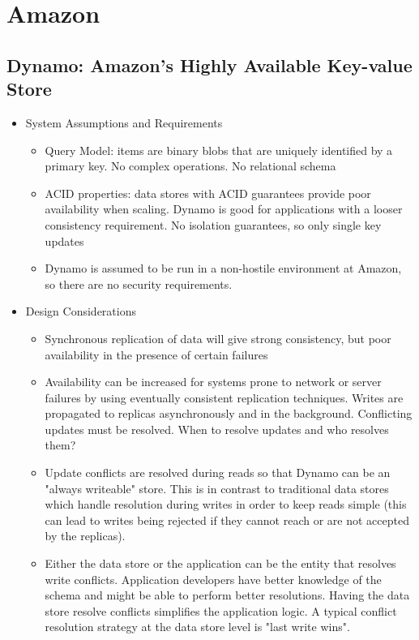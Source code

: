\documentclass[a4paper]{article}
\begin{document}
\section{Amazon}

\subsection{Dynamo: Amazon's Highly Available Key-value Store}

\begin{itemize}
\item System Assumptions and Requirements
\begin{itemize}
\item Query Model: items are binary blobs that are uniquely identified by a primary key. No complex operations. No relational schema

\item  ACID properties: data stores with ACID guarantees provide poor availability when scaling. Dynamo is good for applications with a looser consistency requirement. No isolation guarantees, so only single key updates

\item Dynamo is assumed to be run in a non-hostile environment at Amazon, so there are no security requirements. 
\end{itemize}

\item Design Considerations
\begin{itemize}
\item Synchronous replication of data will give strong consistency, but poor availability in the presence of certain failures

\item Availability can be increased for systems prone to network or server failures by using eventually consistent replication techniques. Writes are propagated to replicas asynchronously and in the background. Conflicting updates must be resolved. When to resolve updates and who resolves them?

\item Update conflicts are resolved during reads so that Dynamo can be an "always writeable" store. This is in contrast to traditional data stores which handle resolution during writes in order to keep reads simple (this can lead to writes being rejected if they cannot reach or are not accepted by the replicas).

\item Either the data store or the application can be the entity that resolves write conflicts. Application developers have better knowledge of the schema and might be able to perform better resolutions. Having the data store resolve conflicts simplifies the application logic. A typical conflict resolution strategy at the data store level is "last write wins".


\end{itemize}
\end{itemize}
\end{document}

